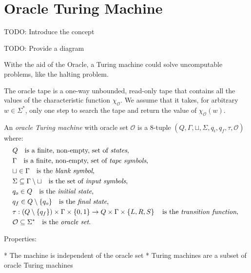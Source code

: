 \section{Oracle Turing Machine}
\label{sec:oracle_turing_machine}

{\color{red} TODO: Introduce the concept}

{\color{red} TODO: Provide a diagram}

Withe the aid of the Oracle, a Turing machine could solve uncomputable problems, like the halting problem.

{\color{red} The oracle tape is a one-way unbounded, read-only tape that contains all the values of the characteristic function $\chi_\mathcal{O}$. We assume that it takes, for arbitrary $w \in \Sigma^\ast$, only one step to search the tape and return the value of $\chi_\mathcal{O}(w)$.}

\begin{definition}
\label{def:Oracle-Turing-Machine}
An \emph{oracle Turing machine} with oracle set $\mathcal{O}$ is a 8-tuple $\left(Q, \Gamma, \sqcup, \Sigma, q_i, q_f, \tau, \mathcal{O} \right)$ where:
\begin{align*}
 & Q \quad \text{is a finite, non-empty, set of \emph{states},} \index{Machine State} \\
 & \Gamma \quad \text{is a finite, non-empty, set of \emph{tape symbols},} \index{Tape Symbol} \\
 & \sqcup\in\Gamma \quad \text{is the \emph{blank symbol},} \index{Blank Symbol} \\
 & \Sigma\subseteq\Gamma\setminus\sqcup \quad \text{is the set of \emph{input symbols},}  \index{Input Symbol} \\
 & q_{o}\in Q \quad \text{is the \emph{initial state},} \index{Initial State} \\
 & q_{f}\in Q \setminus \{q_o\} \quad \text{is the \emph{final state},} \index{Final State} \\ 
 & \tau: \left(Q \setminus \{q_{f}\}\right) \times \Gamma \times \{0, 1\} \rightarrow  Q\times\Gamma\times\left\{ L,R,S\right\} \quad\text{is the \emph{transition function}, \index{Transition Function} } \\
 & \mathcal{O} \subseteq \Sigma^\ast \quad \text{is the \emph{oracle set}.}
\end{align*}
\end{definition}

Properties:

 * The machine is independent of the oracle set
 * Turing machines are a subset of oracle Turing machines

